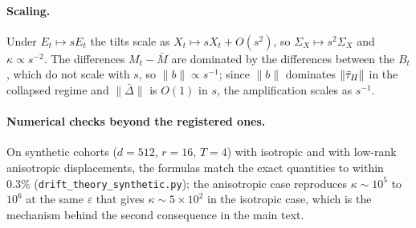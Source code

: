 \paragraph{Scaling.} Under $E_t \mapsto sE_t$ the tilts scale as $X_t \mapsto
sX_t + O(s^2)$, so $\Sigma_X \mapsto s^2\Sigma_X$ and $\kappa \propto s^{-2}$.
The differences $M_t - \bar M$ are dominated by the differences between the
$B_t$, which do not scale with $s$, so $\|b\| \propto s^{-1}$; since $\|b\|$
dominates $\|\bar{\tau}_H\|$ in the collapsed regime and $\|\bar\Delta\|$ is
$O(1)$ in $s$, the amplification scales as $s^{-1}$.

\paragraph{Numerical checks beyond the registered ones.} On synthetic
cohorts ($d = 512$, $r = 16$, $T = 4$) with isotropic and with low-rank
anisotropic displacements, the formulas match the exact quantities to within
$0.3\%$ (\texttt{drift\_theory\_synthetic.py}); the
anisotropic case reproduces $\kappa \sim 10^{5}$ to $10^{6}$ at the same
$\varepsilon$ that gives $\kappa \sim 5\times10^{2}$ in the isotropic case,
which is the mechanism behind the second consequence in the main text.
